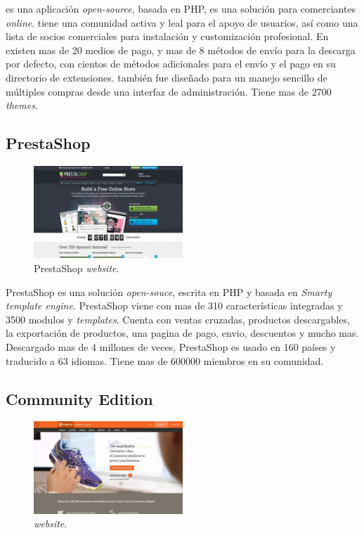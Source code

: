 \nameOpenCart es una aplicación \textit{open-source}, basada en PHP, es una solución \ecommerce para comerciantes \textit{online}. \nameOpenCart tiene una comunidad activa y leal para el apoyo de usuarios, así como una lista de socios comerciales para instalación y customización profesional. En \nameOpenCart existen mas de 20 medios de pago, y mas de 8 métodos de envío para la descarga por defecto, con cientos de métodos adicionales para el envío y el pago en su directorio de extensiones. \nameOpenCart también fue diseñado para un manejo sencillo de múltiples compras desde una interfaz de administración. Tiene mas de 2700 \textit{themes}.

\newcommand{\namePrestaShop}{PrestaShop }
\subsection{\namePrestaShop}

\begin{figure}[h!]
	\centering
	\includegraphics[width=0.5\textwidth]{figuras/cap1/PrestaShopWebsite.jpg}
	\caption{\namePrestaShop \textit{website}\cite{online_PrestaShop}.}
\end{figure}

\namePrestaShop es una solución \ecommerce \textit{open-souce}, escrita en PHP y basada en \textit{Smarty template engine}. \namePrestaShop viene con mas de 310 características integradas y 3500 modulos y \textit{templates}. Cuenta con ventas cruzadas, productos descargables, la exportación de productos, una pagina de pago, envio, descuentos y mucho mas. Descargado mas de 4 millones de veces, \namePrestaShop es usado en 160 países y traducido a 63 idiomas. Tiene mas de 600000 miembros en su comunidad.

\subsection{\nameMagento Community Edition}

\begin{figure}[h!]
	\centering
	\includegraphics[width=0.5\textwidth]{figuras/cap1/MagentoWebsite.jpg}
	\caption{\nameMagento \textit{website}\cite{online_Magento}.}
\end{figure}

